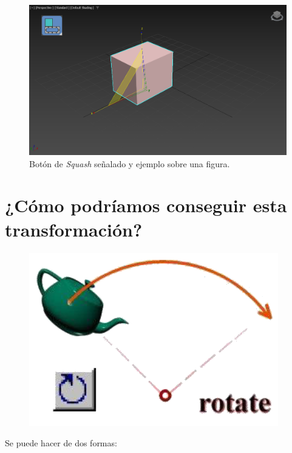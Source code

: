 \documentclass{article}
\begin{document}
\begin{figure}[H]
    \centering
    \includegraphics[width=\textwidth]{imagenes/squash.png}
    \caption{Botón de \textit{Squash} señalado y ejemplo sobre una figura.}
 \end{figure} 


\section{¿Cómo podríamos conseguir esta transformación?}

\begin{figure}[H]
   \centering
   \includegraphics[width=\textwidth]{imagenes/tetera.png}
\end{figure}

Se puede hacer de dos formas:
\end{document}
